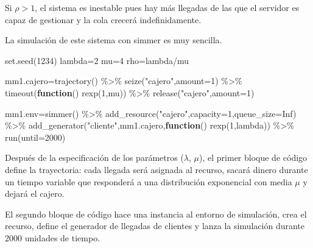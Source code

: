 \documentclass[
]{book}
\newenvironment{Shaded}{\begin{snugshade}}{\end{snugshade}}
\newcommand{\AttributeTok}[1]{\textcolor[rgb]{0.77,0.63,0.00}{#1}}
\newcommand{\ConstantTok}[1]{\textcolor[rgb]{0.00,0.00,0.00}{#1}}
\newcommand{\ControlFlowTok}[1]{\textcolor[rgb]{0.13,0.29,0.53}{\textbf{#1}}}
\newcommand{\DecValTok}[1]{\textcolor[rgb]{0.00,0.00,0.81}{#1}}
\newcommand{\FunctionTok}[1]{\textcolor[rgb]{0.00,0.00,0.00}{#1}}
\newcommand{\NormalTok}[1]{#1}
\newcommand{\OtherTok}[1]{\textcolor[rgb]{0.56,0.35,0.01}{#1}}
\newcommand{\SpecialCharTok}[1]{\textcolor[rgb]{0.00,0.00,0.00}{#1}}
\newcommand{\StringTok}[1]{\textcolor[rgb]{0.31,0.60,0.02}{#1}}
\theoremstyle{definition}
\theoremstyle{definition}
\theoremstyle{definition}
\theoremstyle{definition}
\theoremstyle{remark}
\begin{document}
Si \(\rho>1\), el sistema es inestable pues hay más llegadas de las que el servidor es capaz de gestionar y la cola crecerá indefinidamente.

La simulación de este sistema con simmer es muy sencilla.

\begin{Shaded}
\begin{Highlighting}[]
\FunctionTok{set.seed}\NormalTok{(}\DecValTok{1234}\NormalTok{)}
\NormalTok{lambda}\OtherTok{=}\DecValTok{2}
\NormalTok{mu}\OtherTok{=}\DecValTok{4}
\NormalTok{rho}\OtherTok{=}\NormalTok{lambda}\SpecialCharTok{/}\NormalTok{mu}

\NormalTok{mm1.cajero}\OtherTok{=}\FunctionTok{trajectory}\NormalTok{() }\SpecialCharTok{\%\textgreater{}\%}
  \FunctionTok{seize}\NormalTok{(}\StringTok{"cajero"}\NormalTok{,}\AttributeTok{amount=}\DecValTok{1}\NormalTok{) }\SpecialCharTok{\%\textgreater{}\%}
  \FunctionTok{timeout}\NormalTok{(}\ControlFlowTok{function}\NormalTok{() }\FunctionTok{rexp}\NormalTok{(}\DecValTok{1}\NormalTok{,mu)) }\SpecialCharTok{\%\textgreater{}\%}
  \FunctionTok{release}\NormalTok{(}\StringTok{"cajero"}\NormalTok{,}\AttributeTok{amount=}\DecValTok{1}\NormalTok{)}

\NormalTok{mm1.env}\OtherTok{=}\FunctionTok{simmer}\NormalTok{() }\SpecialCharTok{\%\textgreater{}\%}
  \FunctionTok{add\_resource}\NormalTok{(}\StringTok{"cajero"}\NormalTok{,}\AttributeTok{capacity=}\DecValTok{1}\NormalTok{,}\AttributeTok{queue\_size=}\ConstantTok{Inf}\NormalTok{) }\SpecialCharTok{\%\textgreater{}\%}
  \FunctionTok{add\_generator}\NormalTok{(}\StringTok{"cliente"}\NormalTok{,mm1.cajero,}\ControlFlowTok{function}\NormalTok{() }\FunctionTok{rexp}\NormalTok{(}\DecValTok{1}\NormalTok{,lambda)) }\SpecialCharTok{\%\textgreater{}\%}
  \FunctionTok{run}\NormalTok{(}\AttributeTok{until=}\DecValTok{2000}\NormalTok{) }
\end{Highlighting}
\end{Shaded}

Después de la especificación de los parámetros (\(\lambda\), \(\mu\)), el primer bloque de código define la trayectoria: cada llegada será asignada al recurso, sacará dinero durante un tiempo variable que responderá a una distribución exponencial con media \(\mu\) y dejará el cajero.

El segundo bloque de código hace una instancia al entorno de simulación, crea el recurso, define el generador de llegadas de clientes y lanza la simulación durante 2000 unidades de tiempo.
\end{document}
